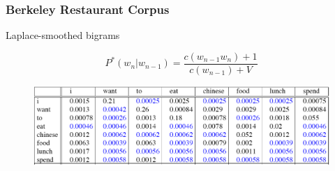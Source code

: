 \documentclass[13.5pt,aspecratio=169]{beamer}
\begin{document}
\begin{frame}
    \onehalfspacing
        \frametitle{Berkeley Restaurant Corpus}
        {\Large Laplace-smoothed bigrams} \vspace{-2em}
        \begin{center} 
            \[ P^*(w_n | w_{n-1}) = \frac{c(w_{n-1} w_n) + 1}{c(w_{n-1}) + V} \]
          \end{center}
        
            \begin{figure}
                \centering
                \includegraphics [scale=0.45] {laplace_smoothed_bigrams.png}
                
            \end{figure}
        
    \end{frame}
\end{document}
